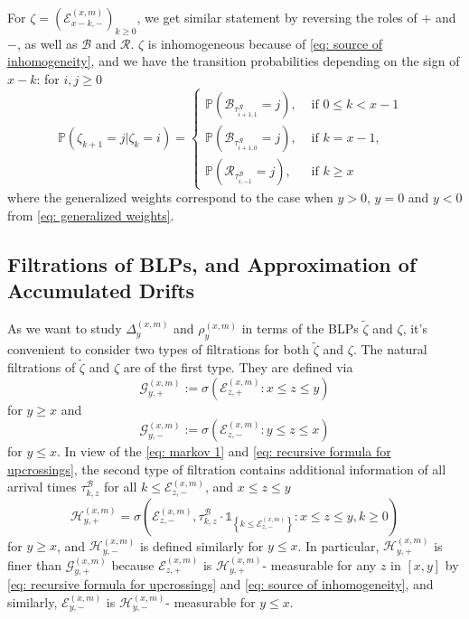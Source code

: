 \documentclass[twoside,12pt, a4paper]{article}
\numberwithin{equation}{section}
\theoremstyle{remark}
\begin{document}
	For $\zeta= \left(\mathcal{E}^{(x,m)}_{x-k,-} \right)_{k\geq 0}$, we get similar statement by reversing the roles of $+$ and $-$, as well as $\mathcal{B}$ and $\mathcal{R}$. $\zeta$ is inhomogeneous because of \eqref{eq: source of inhomogeneity}, and we have the transition probabilities depending on the sign of $x-k$: for $i,j\geq 0$
	\begin{equation}\label{eq: transition prob on negative}
		\mathbb{P}\left(\zeta_{k+1}=j \vert \zeta_k =i  \right) = 
		\begin{cases}
			\mathbb{P}\left( \mathcal{B}_{\tau_{i+1,1}^{\mathcal{R}}} = j \right) ,& \mbox{ if $0 \leq k <  x-1$ }
			\\
			\mathbb{P}\left( \mathcal{B}_{\tau_{i+1,0}^{\mathcal{R}}} = j \right) ,& \mbox{ if $k =  x-1$, }
			\\
			\mathbb{P}\left( \mathcal{R}_{\tau_{i,-1}^{\mathcal{B}}} = j \right) ,& \mbox{ if $k \geq x$ }
		\end{cases}
	\end{equation}
	where the generalized weights correspond to the case when $y>0$, $y=0$ and $y<0$ from \eqref{eq: generalized weights}.
	
	\subsection{Filtrations of BLPs, and Approximation of Accumulated Drifts}\label{subsec: measurability}
	
	As we want to study $\Delta^{(x,m)}_{y}$ and $\rho^{(x,m)}_{y}$ in terms of the BLPs $\tilde{\zeta}$ and $\zeta$, it's convenient to consider two types of filtrations for both $\tilde{\zeta}$ and $\zeta$. The natural filtrations of $\tilde{\zeta}$ and $\zeta$ are of the first type. They are defined via 
	$$\mathcal{G}_{y, +}^{(x,m)}:=\sigma\left(\mathcal{E}^{(x,m)}_{z, +}: x \le z \le y\right) $$ for $y \ge x$ and $$\mathcal{G}_{y, -}^{(x,m)}:=\sigma\left(\mathcal{E}^{(x,m)}_{z, -}: y \le z \le x\right) $$ for $y \le x$.
	In view of the \eqref{eq: markov 1} and \eqref{eq: recursive formula for upcrossings},
	the second type of filtration contains additional information of all arrival times $\tau^\mathcal{B}_{k,z}$ for all $k\leq \mathcal{E}^{(x,m)}_{z, -}$, and $x\leq z \leq y$
	\[
	\mathcal{H}_{y, +}^{(x,m)} = \sigma\left( \mathcal{E}_{z, -}^{(x,m)}, \tau_{k, z}^\mathcal{B}\cdot \mathbb{1}_{\left\{ k\leq \mathcal{E}_{z, -}^{(x,m)} \right\}} : x \leq  z \leq y,  k \geq 0 \right) 
	\]
	for $y\geq x$, and $\mathcal{H}_{y, -}^{(x,m)}$ is defined similarly for $y\leq x$.
	In particular, $\mathcal{H}_{y, +}^{(x,m)}$ is finer than $\mathcal{G}_{y, +}^{(x,m)}$ because $\mathcal{E}_{z, +}^{(x,m)}$ is $\mathcal{H}_{y, +}^{(x,m)}$- measurable for any $z$ in $[x,y]$ by \eqref{eq: recursive formula for upcrossings} and \eqref{eq: source of inhomogeneity}, and similarly, $\mathcal{E}_{y, -}^{(x,m)}$ is $\mathcal{H}_{y, -}^{(x,m)}$- measurable for $ y\leq x$. 
	
\end{document}
